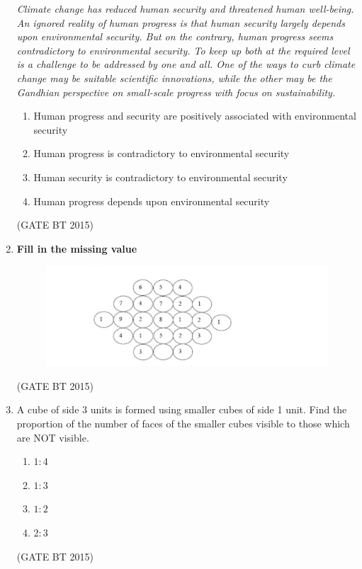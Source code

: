 \documentclass[journal,12pt,onecolumn]{IEEEtran}
\begin{document}
\begin{enumerate}[label=\textbf{Q.\arabic*}]
    \textit{Climate change has reduced human security and threatened human well-being. An ignored reality of human progress is that human security largely depends upon environmental security. But on the contrary, human progress seems contradictory to environmental security. To keep up both at the required level is a challenge to be addressed by one and all. One of the ways to curb climate change may be suitable scientific innovations, while the other may be the Gandhian perspective on small-scale progress with focus on sustainability.}

    \begin{enumerate}
        \item Human progress and security are positively associated with environmental security  
        \item Human progress is contradictory to environmental security  
        \item Human security is contradictory to environmental security  
        \item Human progress depends upon environmental security  
    \end{enumerate}
    \hfill (GATE BT 2015)

\item \textbf{Fill in the missing value}  
    
\begin{figure}[H]
    \centering
    \includegraphics[width=0.7\columnwidth]{fig 1.png}
    \caption{}
    \label{fig:fig8}
\end{figure}
  \hfill (GATE BT 2015)

    \item A cube of side 3 units is formed using smaller cubes of side 1 unit. Find the proportion of the number of faces of the smaller cubes visible to those which are NOT visible.

    \begin{multicols}{4}
    \begin{enumerate}
        \item $1 : 4$  
        \item $1 : 3$  
        \item $1 : 2$  
        \item $2 : 3$  
    \end{enumerate}
    \end{multicols}             \hfill (GATE BT 2015)


\end{enumerate}
\end{document}
